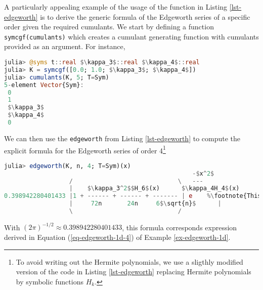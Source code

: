 A particularly appealing example of the usage of the function in Listing \ref{lst-edgeworth} is to derive the generic formula of the Edgeworth series of a specific order given the required cumulants. We start by defining a function \lstinline{symcgf(cumulants)} which creates a cumulant generating function with cumulants provided as an argument. For instance,
\begin{lstlisting}[language=Julia, mathescape, escapechar=\%]
julia> @syms t::real $\kappa_3$::real $\kappa_4$::real
julia> K = symcgf([0.0; 1.0; $\kappa_3$; $\kappa_4$])
julia> cumulants(K, 5; T=Sym)
5-element Vector{Sym}:
 0
 1
 $\kappa_3$
 $\kappa_4$
 0
\end{lstlisting}
We can then use the \lstinline{edgeworth} from Listing \ref{lst-edgeworth} to compute the explicit formula for the Edgeworth series of order 4\footnote{To avoid writing out the Hermite polynomials, we use a sligthly modified version of the code in Listing \ref{lst-edgeworth} replacing Hermite polynomials by symbolic functions $H_k$.}
\begin{lstlisting}[language=Julia, mathescape, escapechar=\%]
julia> edgeworth(K, n, 4; T=Sym)(x)
                                                    -$x^2$  
                  /                             \   ---
                  |    $\kappa_3^2$$H_6$(x)      $\kappa_4H_4$(x)      $\kappa_3H_3$(x)     |   2  
0.398942280401433 |1 + ------ + ------ + ------- | e    %\footnote{This output was lightly adapted to properly render in LaTeX. }%
                  |     72n       24n     6$\sqrt{n}$      |      
                  \                             /    

\end{lstlisting}
With $(2\pi)^{-1/2} \approx 0.398942280401433$, this formula corresponds expression derived in Equation (\ref{eq-edgeworth-1d-4}) of Example \ref{ex-edgeworth-1d}.
\newpage

